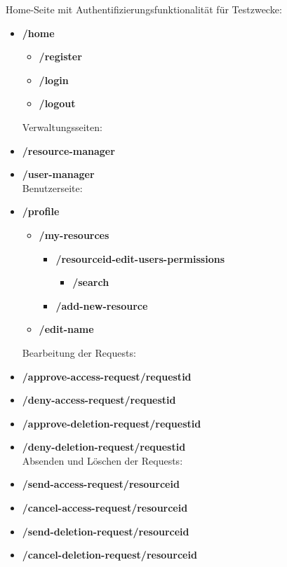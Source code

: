 \documentclass[parskip=full,11pt]{scrartcl}
\begin{document}
\indent Home-Seite mit Authentifizierungsfunktionalität für Testzwecke:
\begin{itemize}[itemsep=0pt]
\item \textbf{/home}
	\begin{itemize}[itemsep=0pt]
	\item \textbf{/register}
	\item \textbf{/login}
	\item \textbf{/logout}\\
	\end{itemize}

\noindent Verwaltungsseiten:
\item \textbf{/resource-manager}
\item \textbf{/user-manager}\\

\noindent Benutzerseite:
\item \textbf{/profile}
	\begin{itemize}[itemsep=0pt]
	\item \textbf{/my-resources}
		\begin{itemize}
		\item \textbf{/resourceid-edit-users-permissions}
			\begin{itemize}
			\item \textbf{/search}
			\end{itemize}
		\item \textbf{/add-new-resource}		
		\end{itemize}
	\item \textbf{/edit-name}\\
	\end{itemize}
\newpage
\noindent Bearbeitung der Requests:
\item \textbf{/approve-access-request/requestid}
\item \textbf{/deny-access-request/requestid}
\item \textbf{/approve-deletion-request/requestid}
\item \textbf{/deny-deletion-request/requestid}\\

\noindent Absenden und Löschen der Requests:
\item \textbf{/send-access-request/resourceid}
\item \textbf{/cancel-access-request/resourceid}
\item \textbf{/send-deletion-request/resourceid}
\item \textbf{/cancel-deletion-request/resourceid}\\


\end{itemize}
\end{document}

